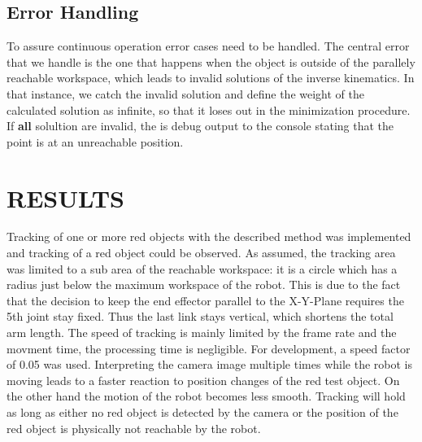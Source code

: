 \documentclass[letterpaper, 10 pt, conference]{ieeeconf}  %
\begin{document}

\subsection{Error Handling}
To assure continuous operation error cases need to be handled. The central error that we handle is the one that happens when
the object is outside of the parallely reachable workspace, which leads to invalid solutions of the inverse kinematics. In that instance, we catch the invalid solution and define the weight of the calculated solution as infinite, so that it loses out in the minimization procedure. If \textbf{all} solultion are invalid, the is debug output to the console stating that the point is at an unreachable position. 

\section{RESULTS}


Tracking of one or more red objects with the described method was implemented and tracking of a red object could be observed. As assumed, the tracking area was limited to a sub area of the reachable workspace: it is a circle which has a radius just below the maximum workspace of the robot. This is due to the fact that the decision to keep the end effector parallel to the X-Y-Plane requires the 5th joint stay fixed. Thus the last link stays vertical, which shortens the total arm length. The speed of tracking is mainly limited by the frame rate and the movment time, the processing time is negligible. For development, a speed factor of 0.05 was used. Interpreting the camera image multiple times while the robot is moving leads to a faster reaction to position changes of the red test object. On the other hand the motion of the robot becomes less smooth. Tracking will hold as long as either no red object is detected by the camera or the position of the red object is physically not reachable by the robot. 
\end{document}
